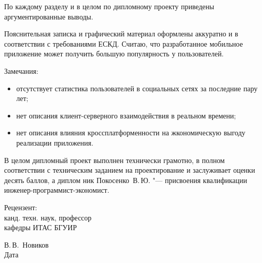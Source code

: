 \begin{singlespace}
{По каждому разделу и в целом по дипломному проекту приведены аргументированные выводы.

Пояснительная записка и графический материал оформлены аккуратно и в соответствии с требованиями ЕСКД.
Считаю, что разработанное мобильное приложение может получить большую популярность у пользователей.

Замечания:
\begin{itemize}
  \item отсутствует статистика пользователей в социальных сетях за последние пару лет;
  \item нет описания клиент-серверного взаимодействия в реальном времени;
  \item нет описания влияния кроссплатформенности на жкономическую выгоду реализации приложения.
\end{itemize}

В целом дипломный проект выполнен технически грамотно, в полном соответствии с техническим заданием на проектирование и заслуживает оценки десять баллов, а диплом
ник Покосенко~В.\,Ю. "--- присвоения квалификации инженер-программист-экономист.

  \vfill
  \noindent
  \begin{minipage}{0.4\textwidth}
    \begin{flushleft}
      Рецензент:\\
      канд. техн. наук, профессор\\
      кафедры ИТАС БГУИР
    \end{flushleft}
  \end{minipage}
  \begin{minipage}{0.58\textwidth}
    \begin{flushright}
    \underline{\hspace*{3cm}}\hspace*{0.5cm}\underline{\hspace*{2cm}} В.\,В.~Новиков \\
    Дата\hspace*{6.5cm}
    \end{flushright}
  \end{minipage}
}

\end{singlespace}
\clearpage